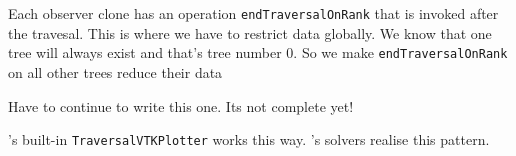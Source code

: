 Each observer clone has an operation \texttt{endTraversalOnRank} that
is invoked after the travesal.
This is where we have to restrict data globally.
We know that one tree will always exist and that's tree number 0. 
So we make \texttt{endTraversalOnRank} on all other trees reduce their data


\begin{remark}
 Have to continue to write this one. Its not complete yet!
\end{remark}


\begin{remark}
 \Peano's built-in \texttt{TraversalVTKPlotter} works this way. 
 \ExaHyPE's solvers realise this pattern.
\end{remark}

